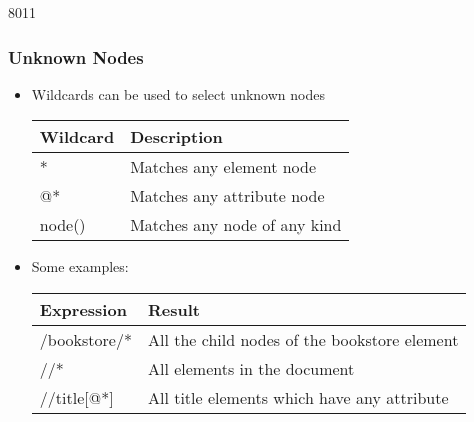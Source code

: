 \begin{slide}[fragile]{8011}
\frametitle{Unknown Nodes}
\begin{itemize}
\item Wildcards can be used to select unknown nodes
\begin{center}
\begin{tabular}{|l|l|}
\hline
\textbf{Wildcard}   & \textbf{Description} \\ \hline
*                   & Matches any element node \\ \hline
@*                  & Matches any attribute node \\ \hline
node()              & Matches any node of any kind \\ \hline
\end{tabular}
\end{center}

\item Some examples:

\begin{center}
\begin{tabular}{|l|l|}
\hline
\textbf{Expression}     & \textbf{Result} \\ \hline
/bookstore/*            & All the child nodes of the bookstore element \\ \hline
//*                     & All elements in the document \\ \hline
//title[@*]             & All title elements which have any attribute \\ \hline
\end{tabular}
\end{center}

\end{itemize}
\end{slide}


